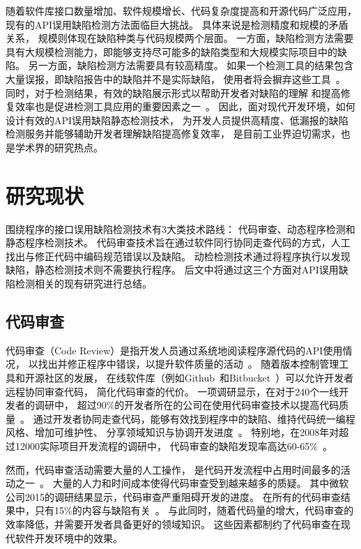 随着软件库接口数量增加、软件规模增长、代码复杂度提高和开源代码广泛应用，
现有的API误用缺陷检测方法面临巨大挑战。
具体来说是检测精度和规模的矛盾关系，
规模则体现在缺陷种类与代码规模两个层面。
一方面，缺陷检测方法需要具有大规模检测能力，即能够支持尽可能多的缺陷类型和大规模实际项目中的缺陷。
另一方面，缺陷检测方法需要具有较高精度。
如果一个检测工具的结果包含大量误报，即缺陷报告中的缺陷并不是实际缺陷，
使用者将会摒弃这些工具~\cite{10-acm-precision}。
同时，对于检测结果，有效的缺陷展示形式以帮助开发者对缺陷的理解
和提高修复效率也是促进检测工具应用的重要因素之一~\cite{13-icse-donotuse}。
因此，面对现代开发环境，如何设计有效的API误用缺陷静态检测技术，
为开发人员提供高精度、低漏报的缺陷检测服务并能够辅助开发者理解缺陷提高修复效率，
是目前工业界迫切需求，也是学术界的研究热点。





\section{研究现状}
围绕程序的接口误用缺陷检测技术有3大类技术路线：
代码审查、动态程序检测和静态程序检测技术。
代码审查技术旨在通过软件同行协同走查代码的方式，人工找出与修正代码中编码规范错误以及缺陷。
动检检测技术通过将程序执行以发现缺陷，静态检测技术则不需要执行程序。
后文中将通过这三个方面对API误用缺陷检测相关的现有研究进行总结。

\subsection{代码审查}
代码审查（Code Review）是指开发人员通过系统地阅读程序源代码的API使用情况，
以找出并修正程序中错误，以提升软件质量的活动~\cite{code-review}。
随着版本控制管理工具和开源社区的发展，
在线软件库（例如Github~\cite{github}和Bitbucket~\cite{bitbucket}）可以允许开发者远程协同审查代码，
简化代码审查的代价。
一项调研显示，在对于240个一线开发者的调研中，
超过90\%的开发者所在的公司在使用代码审查技术以提高代码质量~\cite{17-profes-code-review}。
通过开发者协同走查代码，能够有效找到程序中的缺陷、维持代码统一编程风格、增加可维护性、
分享领域知识与协调开发进度~\cite{13-icse-code-review}。
特别地，在2008年对超过12000实际项目开发流程的调研中，
代码审查的缺陷发现率高达60-65\%~\cite{08-code-review}。

然而，代码审查活动需要大量的人工操作，
是代码开发流程中占用时间最多的活动之一~\cite{13-esem-code-review}。
大量的人力和时间成本使得代码审查受到越来越多的质疑。
其中微软公司2015的调研结果显示，代码审查严重阻碍开发的进度。
在所有的代码审查结果中，只有15\%的内容与缺陷有关~\cite{15-icse-code-review}。
与此同时，随着代码量的增大，代码审查的效率降低，并需要开发者具备更好的领域知识。
这些因素都制约了代码审查在现代软件开发环境中的效果。


